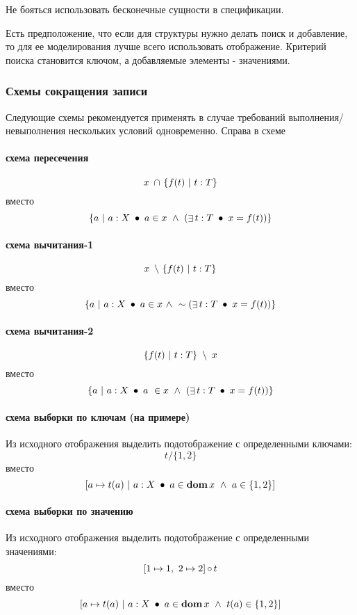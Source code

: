 \documentclass[14pt, twoside]{extreport}
\newcommand{\head}[1]{\vspace{1cm}\subsubsection*{#1}}
\begin{document}
Не бояться использовать бесконечные сущности в спецификации.

Есть предположение, что если для структуры нужно делать поиск и добавление, то для ее моделирования лучше всего использовать отображение. Критерий поиска становится ключом, а добавляемые элементы - значениями.

\head{Схемы сокращения записи}

Следующие схемы рекомендуется применять в случае требований выполнения/невыполнения нескольких условий одновременно. Справа в схеме

\paragraph{схема пересечения}

$$x~\mathop{\cap}~ \{f(t) ~|~ t:T\}$$ вместо $$\{a ~|~ a: X ~\mathop{\bullet}~ a \in x ~\wedge~ ( \mathop{\exists} t: T  ~\mathop{\bullet}~ x = f(t) ) \}$$

\paragraph{схема вычитания-1}

$$x ~\mathop{\setminus}~ \{f(t) ~|~ t:T\}$$ вместо $$\{a ~|~ a: X ~\mathop{\bullet}~ a \in x ~\wedge~  \sim( \mathop{\exists} t: T  ~\mathop{\bullet}~ x = f(t) ) \}$$

\paragraph{схема вычитания-2}

$$\{f(t) ~|~ t:T\} ~\mathop{\setminus}~ x$$ вместо $$\{a ~|~ a: X ~\mathop{\bullet}~ a ~\in x ~\wedge~ ( \mathop{\exists} t: T  ~\mathop{\bullet}~ x = f(t) ) \}$$

\paragraph{схема выборки по ключам (на примере)}
Из исходного отображения выделить подотображение с определенными ключами:
$$t / \{1, 2\}$$ вместо $$[a \mapsto t(a) ~|~ a:X ~\mathop{\bullet}~ a \in \mathop{\textbf{dom}} x ~\wedge~ a \in \{1, 2\} ]$$

\paragraph{схема выборки по значению}
Из исходного отображения выделить подотображение с определенными значениями:
$$[1 \mapsto 1,~ 2 \mapsto 2] \mathop{\circ} t$$ вместо $$[a \mapsto t(a) ~|~ a:X ~\mathop{\bullet}~ a \in \mathop{\textbf{dom}} x ~\wedge~ t(a) \in \{1,2\} ]$$
\end{document}
